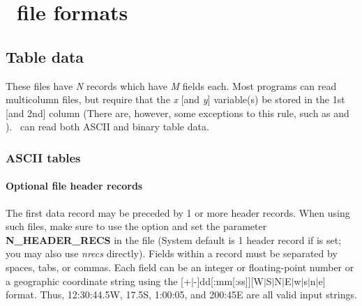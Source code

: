 %
%

\chapter{\gmt\ file formats}
\label{app:B}
\thispagestyle{headings}

\section{Table data} 

These files have \emph{N} records which have \emph{M} fields each.
Most programs can read multicolumn files, but require that the
\emph{x} [and \emph{y}] variable(s) be stored in the 1st [and 2nd]
column (There are, however, some exceptions to this rule, such as
 and ).  \GMT\ can read both ASCII and
binary table data.

\subsection{ASCII tables}
\subsubsection{Optional file header records}
The first data record may be preceded by 1 or more header records.
When using such files, make sure to use the  option and set
the parameter \textbf{N\_HEADER\_RECS} in the  file
(System default is 1 header record if  is set; you may also
use \emph{nrecs} directly).  Fields
within a record must be separated by spaces, tabs, or commas.
Each field can be an integer or floating-point number or a geographic
coordinate string using the [+$|$-]dd[:mm[:ss]][W$|$S$|$N$|$E$|$w$|$s$|$n$|$e] format.
Thus, 12:30:44.5W, 17.5S, 1:00:05, and 200:45E are all valid input strings.
